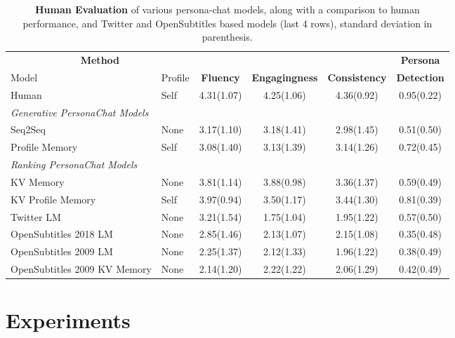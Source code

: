\begin{table*}[t]
  \centering
  \begin{tabular}{ll|cccc}
  \toprule
  \multicolumn{2}{c|}{{\bf Method}} & & & &  \textbf{Persona}   \\
   Model & Profile & \textbf{Fluency} &  \textbf{Engagingness} & \textbf{Consistency} & 
   \textbf{Detection}   \\
  \midrule
  Human  & Self  & 4.31(1.07) & 4.25(1.06)   & 4.36(0.92) &  0.95(0.22) \\
  \midrule
  {\em Generative PersonaChat Models} & \\
  Seq2Seq & None              & 3.17(1.10)&  3.18(1.41) & 2.98(1.45) & 0.51(0.50)\\ %
  Profile Memory   & Self   &3.08(1.40) &  3.13(1.39) & 3.14(1.26) & 0.72(0.45) \\
  \midrule
  {\em Ranking PersonaChat Models} & \\
  KV Memory   & None      & 3.81(1.14) & 3.88(0.98) & 3.36(1.37) & 0.59(0.49)\\ 
  KV Profile Memory   & Self & 3.97(0.94) & 3.50(1.17)  & 3.44(1.30) & 0.81(0.39)\\ 
  \midrule
   Twitter LM & None & 3.21(1.54) & 1.75(1.04) & 1.95(1.22) & 0.57(0.50) \\
   OpenSubtitles 2018 LM & None & 2.85(1.46) & 2.13(1.07) & 2.15(1.08) & 0.35(0.48) \\
   OpenSubtitles 2009 LM & None & 2.25(1.37) & 2.12(1.33) & 1.96(1.22) & 0.38(0.49) \\
   OpenSubtitles 2009 KV Memory & None & 2.14(1.20)  & 2.22(1.22) & 2.06(1.29)  & 0.42(0.49) \\ 
  \bottomrule
  \end{tabular}
 \caption{{\bf Human Evaluation} of  various {\sc persona-chat} models,    along with a  comparison to human performance, and Twitter and OpenSubtitles based models (last 4 rows), standard deviation in parenthesis.
     \label{tab:human-eval}
     } 
\end{table*}


\section{Experiments}

